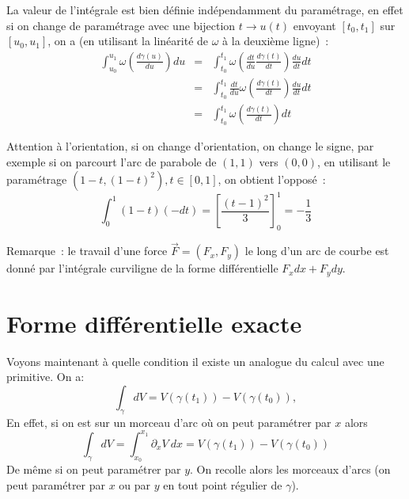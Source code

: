 \documentclass[a4paper,11pt]{book}
\begin{document}
\begin{giacjshere}
La valeur de l'int\'egrale est bien d\'efinie
ind\'ependamment du param\'etrage, 
en effet si on change de param\'etrage avec une bijection
$t \rightarrow u(t)$ envoyant $[t_0,t_1]$ sur $[u_0,u_1]$, on a (en
utilisant la lin\'earit\'e de $\omega$ \`a la deuxi\`eme ligne)~:
\begin{eqnarray*}
 \int_{u_0}^{u_1} \omega\left(\frac{d\gamma(u)}{du}\right) du 
&= &\int_{t_0}^{t_1} \omega\left( \frac{dt}{du} \frac{d\gamma(t)}{dt} \right)
    \frac{du}{dt} dt \\
&=& \int_{t_0}^{t_1}  \frac{dt}{du} \omega\left( \frac{d\gamma(t)}{dt} \right)
    \frac{du}{dt} dt \\
&=& \int_{t_0}^{t_1}  \omega\left( \frac{d\gamma(t)}{dt}  \right) dt
\end{eqnarray*}

Attention \`a l'orientation, si on change d'orientation, on change le
signe, par exemple si on parcourt l'arc de parabole de $(1,1)$
vers $(0,0)$, en utilisant le param\'etrage $(1-t,(1-t)^2), t \in
[0,1]$, on obtient l'oppos\'e~:
$$ \int_0^1 (1-t) (-dt) = \left[\frac{(t-1)^2}{3}\right]_0^1 = -\frac{1}{3}$$

Remarque~: le travail d'une force $\overrightarrow{F}=(F_x,F_y)$ le 
long d'un arc de courbe est donn\'e par l'int\'egrale curviligne de la forme
diff\'erentielle $F_x dx+F_ydy$. 

\section{Forme diff\'erentielle exacte}
Voyons maintenant \`a quelle condition il existe un analogue du calcul
avec une primitive. On a:
$$ \int_\gamma dV=V(\gamma(t_1))-V(\gamma(t_0)), $$
En effet, si on est sur un morceau d'arc o\`u on peut param\'etrer 
par $x$ alors
$$ \int_\gamma dV=\int_{x_0}^{x_1} \partial_x V \ dx =
V(\gamma(t_1))-V(\gamma(t_0))$$
De m\^eme si on peut param\'etrer par $y$. On recolle
alors les morceaux d'arcs (on peut param\'etrer par $x$
ou par $y$ en tout point r\'egulier de $\gamma$).


\end{giacjshere}
\end{document}
